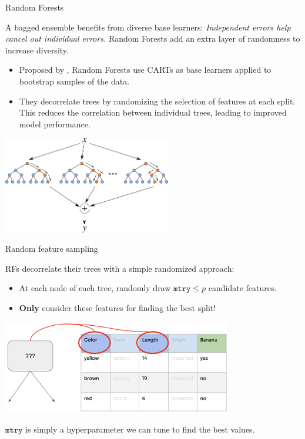 \documentclass[11pt,compress,t,notes=noshow, xcolor=table]{beamer}
\begin{document}
\begin{vbframe}{Random Forests}

A bagged ensemble benefits from diverse base learners: \textit{Independent errors help cancel out individual errors.} Random Forests add an extra layer of randomness to increase diversity.

\begin{itemize}
\item Proposed by , Random Forests use CARTs as base learners applied to bootstrap samples of the data.
\item They decorrelate trees by randomizing the selection of features at each split. This reduces the correlation between individual trees, leading to improved model performance.
\end{itemize}

\begin{center}
\includegraphics[width=0.55\textwidth]{figure_man/forest.png}
\end{center}

\end{vbframe}


\begin{vbframe}{Random feature sampling}

RFs decorrelate their trees with a simple randomized approach:

\begin{itemize}
  \item At each node of each tree, randomly draw $\texttt{mtry} \le p$ candidate features.
  \item \textbf{Only} consider these features for finding the best split!
\end{itemize}

\begin{center}
\includegraphics[width=0.75\textwidth]{figure_man/forest-feature-sampling.png}
\end{center}

$\texttt{mtry}$ is simply a hyperparameter we can tune to find the best values.

\end{vbframe}
\end{document}
